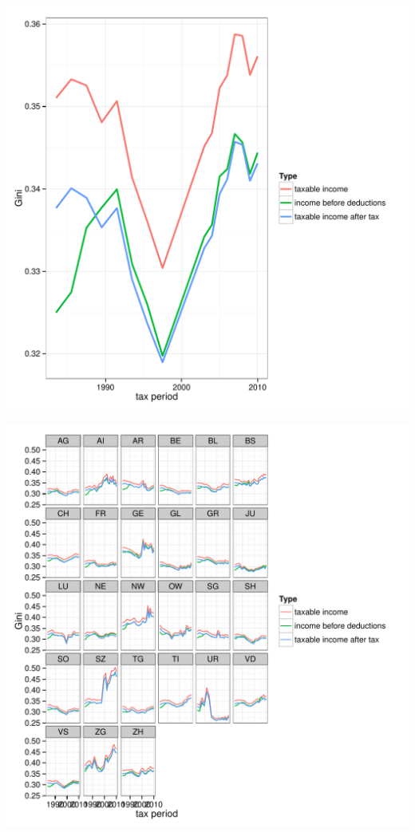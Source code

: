 \begin{knitrout}
\includegraphics[width=\maxwidth]{figure/different_ginis1} 
\begin{kframe}\begin{alltt}
 \hlstd{(}      \hlopt{+} \hlstd{()} \hlopt{+}
    \hlstd{(}\hlopt{~} \hlopt{+} \hlstd{()} \hlopt{+} \hlstd{(}\hlstd{)}
\end{alltt}
\end{kframe}
\includegraphics[width=\maxwidth]{figure/different_ginis2} 

\end{knitrout}


